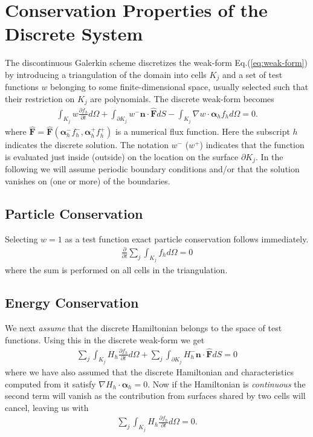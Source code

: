 \documentclass[11pt, reqno]{amsart}
\newcommand{\eqr}[1]{Eq.\thinspace(#1)}
\newcommand{\pfrac}[2]{\frac{\partial #1}{\partial #2}}
\newcommand{\mvec}[1]{\mathbf{#1}}
\newcommand{\gvec}[1]{\boldsymbol{#1}}
\theoremstyle{definition}
\begin{document}
\section{Conservation Properties of the Discrete System}

The discontinuous Galerkin scheme discretizes the weak-form
\eqr{\ref{eq:weak-form}} by introducing a triangulation of the domain
into cells $K_j$ and a set of test functions $w$ belonging to some
finite-dimensional space, usually selected such that their restriction
on $K_j$ are polynomials. The discrete weak-form becomes
\begin{align}
  \int_{K_j} w\pfrac{f_h}{t}d\Omega + 
  \int_{\partial K_j}w^-
  \mvec{n} \cdot \hat{\mvec{F}}dS 
  - \int_{K_j}
  \nabla w \cdot \gvec{\alpha}_h
  f_h d\Omega = 0. \label{eq:dis-weak-form}
\end{align}
where $\hat{\mvec{F}} = \hat{\mvec{F}}(\gvec{\alpha}_h^- f_h^-,
\gvec{\alpha}_h^+ f_h^+)$ is a numerical flux function. Here the
subscript $h$ indicates the discrete solution. The notation $w^-$
($w^+$) indicates that the function is evaluated just inside (outside)
on the location on the surface $\partial K_j$. In the following we
will assume periodic boundary conditions and/or that the solution
vanishes on (one or more) of the boundaries.

\subsection{Particle Conservation}

Selecting $w=1$ as a test function exact particle conservation follows
immediately.
\begin{align}
  \frac{\partial }{\partial t}\sum_j \int_{K_j} f_hd\Omega
  =
  0
\end{align}
where the sum is performed on all cells in the triangulation.

\subsection{Energy Conservation}

We next \emph{assume} that the discrete Hamiltonian belongs to the
space of test functions. Using this in the discrete weak-form we get
\begin{align}
  \sum_j\int_{K_j} H_h\pfrac{f_h}{t}d\Omega + 
  \sum_j \int_{\partial K_j}H_h^-
  \mvec{n} \cdot \hat{\mvec{F}}dS 
  = 0
\end{align}
where we have also assumed that the discrete Hamiltonian and
characteristics computed from it satisfy $\nabla H_h \cdot
\gvec{\alpha}_h = 0$. Now if the Hamiltonian is \emph{continuous} the
second term will vanish as the contribution from surfaces shared by
two cells will cancel, leaving us with
\begin{align}
  \sum_j\int_{K_j} H_h\pfrac{f_h}{t}d\Omega = 0.
\end{align}
\end{document}
